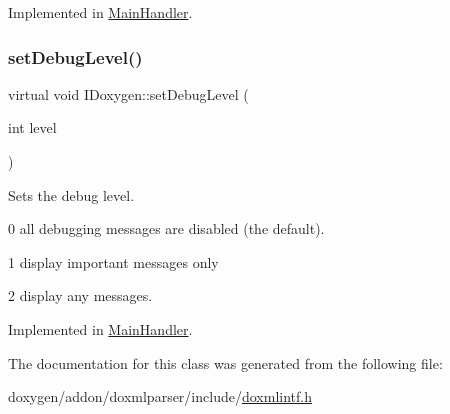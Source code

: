 Implemented in \mbox{\hyperlink{class_main_handler_a4856c87039eb9235d0fa7e10d8912e55}{Main\+Handler}}.

\mbox{\label{class_i_doxygen_ae8e3759ffc6d64684dc500855f6fead6}} 
\subsubsection{\texorpdfstring{setDebugLevel()}{setDebugLevel()}\hspace{0.1cm}{\footnotesize\ttfamily [2/2]}}
{\footnotesize\ttfamily virtual void I\+Doxygen\+::set\+Debug\+Level (\begin{DoxyParamCaption}\item[{int}]{level }\end{DoxyParamCaption})\hspace{0.3cm}{\ttfamily [pure virtual]}}

Sets the debug level.
\begin{DoxyItemize}
\item 0 all debugging messages are disabled (the default).
\item 1 display important messages only
\item 2 display any messages. 
\end{DoxyItemize}

Implemented in \mbox{\hyperlink{class_main_handler_a4856c87039eb9235d0fa7e10d8912e55}{Main\+Handler}}.



The documentation for this class was generated from the following file\+:\begin{DoxyCompactItemize}
\item 
doxygen/addon/doxmlparser/include/\mbox{\hyperlink{include_2doxmlintf_8h}{doxmlintf.\+h}}\end{DoxyCompactItemize}
